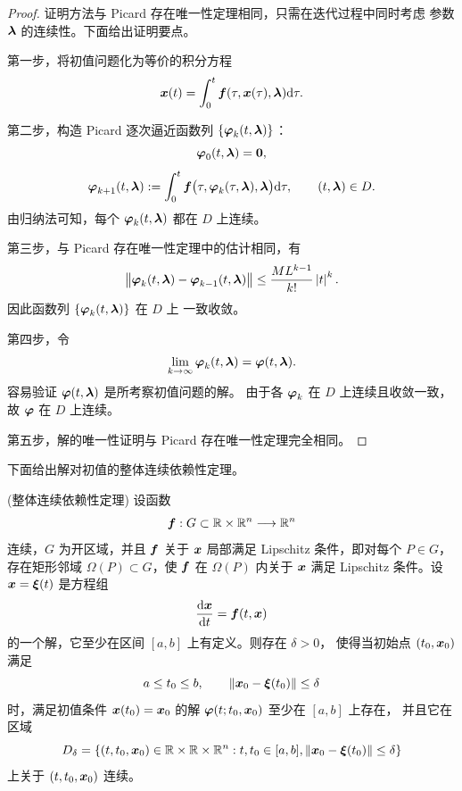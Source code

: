 \begin{proof}
	证明方法与 Picard 存在唯一性定理相同，只需在迭代过程中同时考虑
	参数 $\boldsymbol{\lambda}$ 的连续性。下面给出证明要点。

	第一步，将初值问题化为等价的积分方程
	\[
		\boldsymbol{x}(t)
		=\int_0^t
		\boldsymbol{f}(\tau,\boldsymbol{x}(\tau),\boldsymbol{\lambda})\mathrm{d}\tau.
	\]

	第二步，构造 Picard 逐次逼近函数列
	$\{\boldsymbol{\varphi}_k(t,\boldsymbol{\lambda})\}$：
	\[
		\boldsymbol{\varphi}_0(t,\boldsymbol{\lambda})=\boldsymbol{0},
	\]
	\[
		\boldsymbol{\varphi}_{k+1}(t,\boldsymbol{\lambda})\mathrel{:=}
		\int_0^t
		\boldsymbol{f}\bigl(
		\tau,\boldsymbol{\varphi}_k(\tau,\boldsymbol{\lambda}),\boldsymbol{\lambda}
		\bigr)\mathrm{d}\tau,
		\qquad (t,\boldsymbol{\lambda})\in D.
	\]
	由归纳法可知，每个 $\boldsymbol{\varphi}_k(t,\boldsymbol{\lambda})$ 都在
	$D$ 上连续。

	第三步，与 Picard 存在唯一性定理中的估计相同，有
	\[
		\left\| 
		\boldsymbol{\varphi}_k(t,\boldsymbol{\lambda})
		-\boldsymbol{\varphi}_{k-1}(t,\boldsymbol{\lambda})
		 \right\|
		\leq
		\dfrac{ML^{k-1}}{k!}\left| t \right|^k.
	\]
	因此函数列 $\{\boldsymbol{\varphi}_k(t,\boldsymbol{\lambda})\}$ 在 $D$ 上
	一致收敛。

	第四步，令
	\[
		\lim_{k\to\infty}\boldsymbol{\varphi}_k(t,\boldsymbol{\lambda})
		=\boldsymbol{\varphi}(t,\boldsymbol{\lambda}).
	\]
	容易验证 $\boldsymbol{\varphi}(t,\boldsymbol{\lambda})$ 是所考察初值问题的解。
	由于各 $\boldsymbol{\varphi}_k$ 在 $D$ 上连续且收敛一致，故
	$\boldsymbol{\varphi}$ 在 $D$ 上连续。

	第五步，解的唯一性证明与 Picard 存在唯一性定理完全相同。
\end{proof}

下面给出解对初值的整体连续依赖性定理。

\begin{theorem}(整体连续依赖性定理)\label{thm:整体连续依赖性定理}
	设函数
	\[
		\boldsymbol{f}:G\subset\mathbb{R}\times\mathbb{R}^n\longrightarrow\mathbb{R}^n
	\]
	连续，$G$ 为开区域，并且 $\boldsymbol{f}$ 关于 $\boldsymbol{x}$ 局部满足
	Lipschitz 条件，即对每个 $P\in G$，存在矩形邻域
	$\Omega(P)\subset G$，使 $\boldsymbol{f}$ 在 $\Omega(P)$ 内关于
	$\boldsymbol{x}$ 满足 Lipschitz 条件。设
	$\boldsymbol{x}=\boldsymbol{\xi}(t)$ 是方程组
	\[
		\dfrac{\mathrm{d}\boldsymbol{x}}{\mathrm{d} t}=\boldsymbol{f}(t,\boldsymbol{x})
	\]
	的一个解，它至少在区间 $[a,b]$ 上有定义。则存在 $\delta>0$，
	使得当初始点 $(t_0,\boldsymbol{x}_0)$ 满足
	\[
		a\leq t_0\leq b,
		\qquad
		\left\| \boldsymbol{x}_0-\boldsymbol{\xi}(t_0) \right\|\leq\delta
	\]
	时，满足初值条件 $\boldsymbol{x}(t_0)=\boldsymbol{x}_0$ 的解
	$\boldsymbol{\varphi}(t;t_0,\boldsymbol{x}_0)$ 至少在 $[a,b]$ 上存在，
	并且它在区域
	\[
		D_\delta=\left\{
		(t,t_0,\boldsymbol{x}_0)\in\mathbb{R}\times\mathbb{R}\times\mathbb{R}^n:
		t,t_0\in[a,b],
		\left\| \boldsymbol{x}_0-\boldsymbol{\xi}(t_0) \right\|\leq\delta
		\right\}
	\]
	上关于 $(t,t_0,\boldsymbol{x}_0)$ 连续。
\end{theorem}

